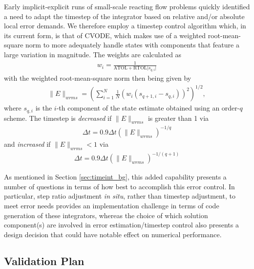 Early implicit-explicit runs of small-scale reacting flow problems
quickly identified a need to adapt the timestep of the integrator based
on relative and/or absolute local error demands. We therefore employ a
timestep control algorithm which, in its current form, is that of CVODE, which makes use of a weighted
root-mean-square norm to more adequately handle states with components that
feature a large variation in magnitude. The weights are calculated as
\begin{align}
w_{i} = \frac{1}{\text{ATOL} + \text{RTOL} \lvert s_{q,i} \rvert}
\end{align}
with the weighted root-mean-square norm then being given by
\begin{align}
\|E\|_{wrms} = \left(\sum_{i=1}^{N} \frac{1}{N} (w_{i}(s_{q+1,i} - s_{q,i}))^2 \right)^{1/2},
\end{align}
where $s_{q,i}$ is the $i$-th component of the state estimate obtained using an order-$q$ scheme.
The timestep is \emph{decreased} if $\|E\|_{wrms}$ is greater than 1 via
\begin{align}
\Delta t = 0.9\Delta t (\|E\|_{wrms})^{-1/q}
\end{align}
and \emph{increased} if $\|E\|_{wrms}<1$ via
\begin{align}
\Delta t = 0.9\Delta t (\|E\|_{wrms})^{-1/(q+1)}
\end{align}

As mentioned in Section \ref{sec:timeint_bg}, this added capability presents a number of
questions in terms of how best to accomplish this error control. In particular,
step ratio adjustment \emph{in situ}, rather than timestep adjustment, to meet error
needs provides an implementation challenge in terms of code generation of these
integrators, whereas the choice of which solution component(s) are involved in error
estimation/timestep control also presents a design decision that could have notable
effect on numerical performance.

\subsection{Validation Plan}

